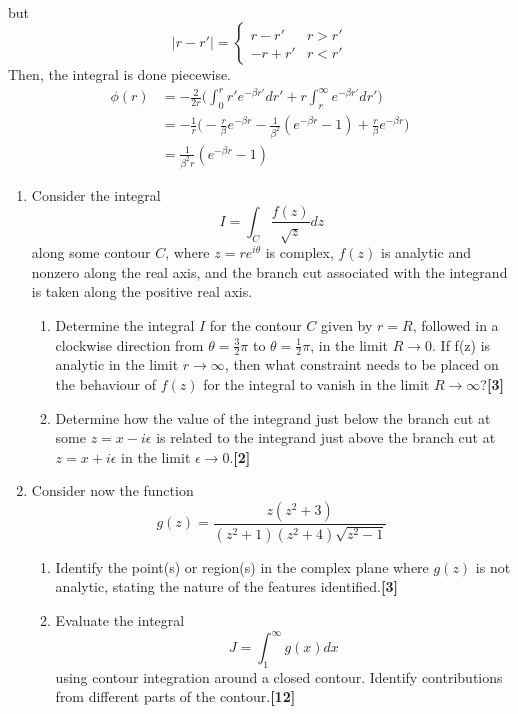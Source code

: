 \documentclass[a4paper]{article}
\begin{document}
\begin{ans}
\begin{enumerate}[label=(\alph*)]
\begin{enumerate}[label=(\roman*)]
\begin{eqnarray}
\end{eqnarray}
but 
$$|r-r'|=
\left\{
        \begin{array}{ll}
      r-r' & r>r' \\
      -r+r' & r<r'
        \end{array}
    \right.$$
Then, the integral is done piecewise.
\begin{align}
\phi(r)&=-\frac{2}{2r}\bigg(\int_0^rr'e^{-\beta r'}dr'+r\int_r^\infty e^{-\beta r'}dr'\bigg)\nonumber\\&=-\frac{1}{r}\bigg(-\frac{r}{\beta}e^{-\beta r}-\frac{1}{\beta^2}(e^{-\beta r}-1)+\frac{r}{\beta}e^{-\beta r}\bigg)\nonumber\\&=\frac{1}{\beta^2r}(e^{-\beta r}-1)\nonumber
\end{align}
\end{enumerate}
\end{enumerate}
\end{ans}
\begin{qns}\leavevmode
\begin{enumerate}[label=(\alph*)]
\item Consider the integral
$$I=\int_C\frac{f(z)}{\sqrt{z}}dz$$
along some contour $C$, where $z=re^{i\theta}$ is complex, $f(z)$ is analytic and nonzero along the real axis, and the branch cut associated with the integrand is taken along the positive real axis.
\begin{enumerate}[label=(\roman*)]
\item Determine the integral $I$ for the contour $C$ given by $r = R$, followed in a clockwise direction from $\theta=\frac{3}{2}\pi$ to $\theta=\frac{1}{2}\pi$, in the limit $R\rightarrow 0$. If f(z) is analytic in the limit $r\rightarrow\infty$, then what constraint needs to be placed on the behaviour of $f(z)$ for the integral to vanish in the limit $R\rightarrow\infty$?\hfill\textbf{[3]}
\item Determine how the value of the integrand just below the branch cut at some $z=x-i\epsilon$ is related to the integrand just above the branch cut at $z = x + i\epsilon$ in the limit $\epsilon\rightarrow0$.\hfill\textbf{[2]}
\end{enumerate}
\item Consider now the function
$$g(z)=\frac{z(z^2+3)}{(z^2+1)(z^2+4)\sqrt{z^2-1}}$$
\begin{enumerate}[label=(\roman*)]
\item Identify the point(s) or region(s) in the complex plane where $g(z)$ is not analytic, stating the nature of the features identified.\hfill\textbf{[3]}
\item Evaluate the integral
$$J=\int_1^\infty g(x)dx$$
using contour integration around a closed contour. Identify contributions from different parts of the contour.\hfill\textbf{[12]}
\end{enumerate}
\end{enumerate}
\end{qns}
\end{document}

